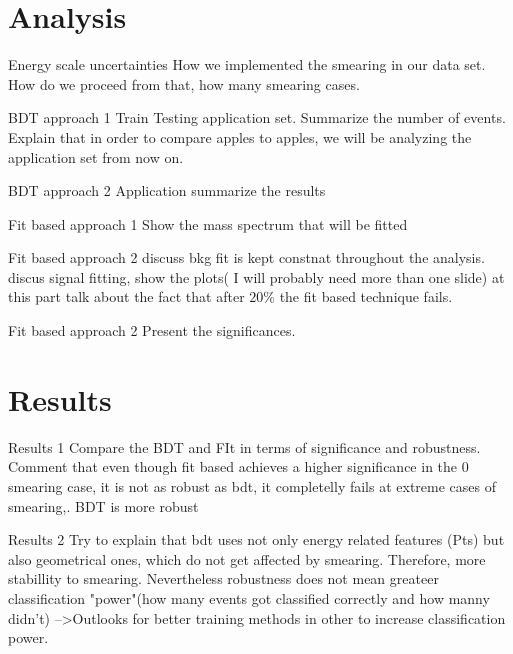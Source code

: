 \documentclass[bigger]{beamer}
\begin{document}
\section{Analysis}
\label{sec:orgde5e0f0}
\begin{frame}[label={sec:org904e48a}]{Energy scale uncertainties}
How we implemented the smearing in our data set. How do we proceed from that, how many smearing cases. 
\end{frame}
\begin{frame}[label={sec:org791cad8}]{BDT approach 1}
Train Testing application set. Summarize the number of events. Explain that in order to compare apples to apples, we will be analyzing the application set from now on.
\end{frame}
\begin{frame}[label={sec:org69bf5d3}]{BDT approach 2}
Application summarize the results 
\end{frame}
\begin{frame}[label={sec:org6f79138}]{Fit based approach 1}
Show the mass spectrum that will be fitted 
\end{frame}
\begin{frame}[label={sec:orgc585192}]{Fit based approach 2}
discuss bkg fit is kept constnat throughout the analysis. discus signal fitting, show the plots( I will probably need more than one slide) at this part talk about the fact that after \(20\%\) the fit based technique fails. 
\end{frame}
\begin{frame}[label={sec:org5ae82d2}]{Fit based approach 2}
Present the significances.
\end{frame}
\section{Results}
\label{sec:org83a0279}
\begin{frame}[label={sec:org9299336}]{Results 1}
Compare the BDT and FIt in terms of significance and robustness. Comment that even though fit based achieves a higher significance in the 0 smearing case, it is not as robust as bdt, it completelly fails at extreme cases of smearing,. BDT is more robust 
\end{frame}
\begin{frame}[label={sec:org5c474ee}]{Results 2}
Try to explain that bdt uses not only energy related features (Pts) but also geometrical ones, which do not get affected by smearing. Therefore, more stabillity to smearing. Nevertheless robustness does not mean greateer classification "power"(how many events got classified correctly and how manny didn't) -->Outlooks for better training methods in other to increase classification power.   
\end{frame}
\end{document}

